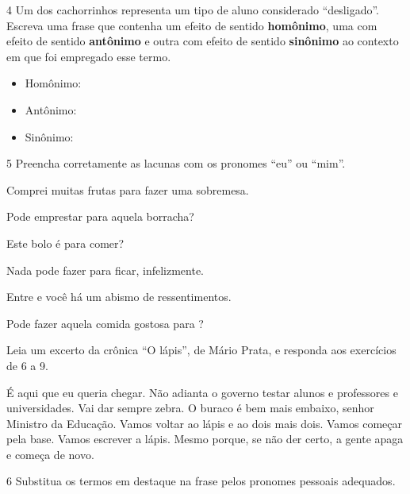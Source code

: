 \num{4} Um dos cachorrinhos representa um tipo de aluno considerado
``desligado''. Escreva uma frase que contenha um efeito de sentido
\textbf{homônimo}, uma com efeito de sentido \textbf{antônimo} e outra
com efeito de sentido \textbf{sinônimo} ao contexto em que foi empregado
esse termo.

\begin{itemize}
\item Homônimo: 
\item Antônimo: 
\item Sinônimo: 
\end{itemize}

\num{5} Preencha corretamente as lacunas com os pronomes ``eu'' ou
``mim''.

\begin{escolha}
\item Comprei muitas frutas para  fazer uma sobremesa.
\item Pode emprestar para  aquela borracha?
\item Este bolo é para  comer?
\item Nada pode fazer para  ficar, infelizmente.
\item Entre  e você há um abismo de ressentimentos.
\item Pode fazer aquela comida gostosa para ?
\end{escolha}

Leia um excerto da crônica ``O lápis'', de Mário Prata, e responda aos
exercícios de 6 a 9.

\begin{myquote}
É aqui que eu queria chegar. Não adianta o governo testar alunos e
professores e universidades. Vai dar sempre zebra. O buraco é bem mais
embaixo, senhor Ministro da Educação. Vamos voltar ao lápis e ao dois
mais dois. Vamos começar pela base. Vamos escrever a lápis. Mesmo
porque, se não der certo, a gente apaga e começa de novo.

\end{myquote}

\num{6} Substitua os termos em destaque na frase pelos pronomes pessoais
adequados.

